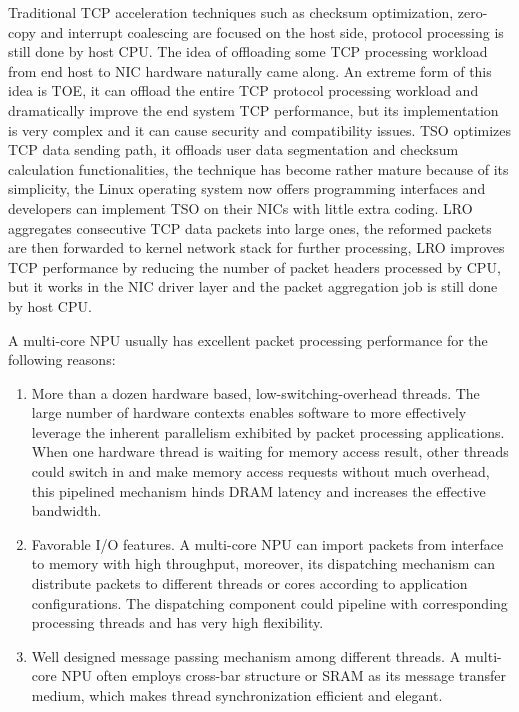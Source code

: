 \documentclass[conference]{IEEEtran}
\begin{document}
Traditional TCP acceleration techniques such as checksum optimization\cite{braden1989computing}\cite{mallory1990incremental}\cite{rijsinghani1994computation}\cite{kleinpaste1995software}, zero-copy\cite{chu1996zero} and interrupt coalescing\cite{dong2011optimizing} are focused on the host side, protocol processing is still done by host CPU. The idea of offloading some TCP processing workload from end host to NIC hardware naturally came along. An extreme form of this idea is TOE\cite{yeh2002introduction}, it can offload the entire TCP protocol processing workload and dramatically improve the end system TCP performance, but its implementation is very complex and it can cause security and compatibility issues\cite{mogul2003tcp}. TSO\cite{connery1999offload} optimizes TCP data sending path, it offloads user data segmentation and checksum calculation functionalities, the technique has become rather mature because of its simplicity, the Linux operating system now offers programming interfaces and developers can implement TSO on their NICs with little extra coding. LRO\cite{grossman2005large} aggregates consecutive TCP data packets into large ones, the reformed packets are then forwarded to kernel network stack for further processing, LRO improves TCP performance by reducing the number of packet headers processed by CPU, but it works in the NIC driver layer and the packet aggregation job is still done by host CPU.

A multi-core NPU usually has excellent packet processing performance for the following reasons:
\begin{enumerate}
\item More than a dozen hardware based, low-switching-overhead threads. The large number of hardware contexts enables software to more effectively leverage the inherent parallelism exhibited by packet processing applications. When one hardware thread is waiting for memory access result, other threads could switch in and make memory access requests without much overhead, this pipelined mechanism hinds DRAM latency and increases the effective bandwidth.
\item Favorable I/O features. A multi-core NPU can import packets from interface to memory with high throughput, moreover, its dispatching mechanism can distribute packets to different threads or cores according to application configurations. The dispatching component could pipeline with corresponding processing threads and has very high flexibility.
\item Well designed message passing mechanism among different threads. A multi-core NPU often employs cross-bar structure or SRAM as its message transfer medium, which makes thread synchronization efficient and elegant.
\end{enumerate}
\end{document}

